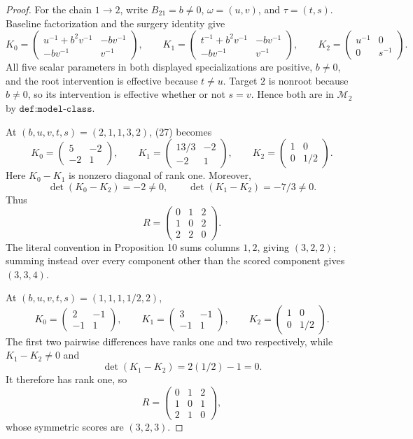 \documentclass{article}
\begin{document}
\begin{proof}
For the chain \(1\to2\), write \(B_{21}=b\neq0\), \(\omega=(u,v)\), and \(\tau=(t,s)\).  Baseline factorization and the surgery identity give
\[
 K_0=
 \begin{pmatrix}
 u^{-1}+b^2v^{-1}&-bv^{-1}\\
 -bv^{-1}&v^{-1}
 \end{pmatrix},\qquad
 K_1=
 \begin{pmatrix}
 t^{-1}+b^2v^{-1}&-bv^{-1}\\
 -bv^{-1}&v^{-1}
 \end{pmatrix},\qquad
 K_2=
 \begin{pmatrix}
 u^{-1}&0\\0&s^{-1}
 \end{pmatrix}.                                             \tag{27}
\]
All five scalar parameters in both displayed specializations are positive, \(b\neq0\), and the root intervention is effective because \(t\neq u\).  Target \(2\) is nonroot because \(b\neq0\), so its intervention is effective whether or not \(s=v\).  Hence both are in \(\mathcal M_2\) by \(\texttt{def:model-class}\).

At \((b,u,v,t,s)=(2,1,1,3,2)\), (27) becomes
\[
 K_0=\begin{pmatrix}5&-2\\-2&1\end{pmatrix},\qquad
 K_1=\begin{pmatrix}13/3&-2\\-2&1\end{pmatrix},\qquad
 K_2=\begin{pmatrix}1&0\\0&1/2\end{pmatrix}.
\]
Here \(K_0-K_1\) is nonzero diagonal of rank one.  Moreover,
\[
 \det(K_0-K_2)=-2\neq0,
 \qquad
 \det(K_1-K_2)=-7/3\neq0.
\]
Thus
\[
 R=\begin{pmatrix}0&1&2\\1&0&2\\2&2&0\end{pmatrix}.       \tag{28}
\]
The literal convention in Proposition 10 sums columns \(1,2\), giving \((3,2,2)\); summing instead over every component other than the scored component gives \((3,3,4)\).

At \((b,u,v,t,s)=(1,1,1,1/2,2)\),
\[
 K_0=\begin{pmatrix}2&-1\\-1&1\end{pmatrix},\qquad
 K_1=\begin{pmatrix}3&-1\\-1&1\end{pmatrix},\qquad
 K_2=\begin{pmatrix}1&0\\0&1/2\end{pmatrix}.
\]
The first two pairwise differences have ranks one and two respectively, while \(K_1-K_2\neq0\) and
\[
 \det(K_1-K_2)=2(1/2)-1=0.
\]
It therefore has rank one, so
\[
 R=\begin{pmatrix}0&1&2\\1&0&1\\2&1&0\end{pmatrix},
\]
whose symmetric scores are \((3,2,3)\).


\end{proof}
\end{document}

